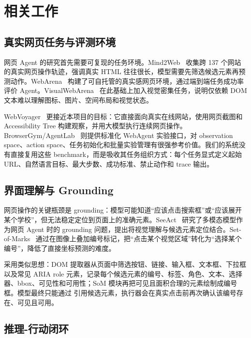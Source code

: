 ﻿%

\section{相关工作}

\subsection{真实网页任务与评测环境}

网页 Agent 的研究首先需要可复现的任务环境。Mind2Web~\cite{mind2web} 收集跨 137 个网站的真实网页操作轨迹，强调真实 HTML 往往很长，模型需要先筛选候选元素再预测动作。WebArena~\cite{webarena} 构建了可自托管的真实感网页环境，通过端到端任务成功率评价 Agent。VisualWebArena~\cite{visualwebarena} 在此基础上加入视觉密集任务，说明仅依赖 DOM 文本难以理解图标、图片、空间布局和视觉状态。

WebVoyager~\cite{webvoyager} 更接近本项目的目标：它直接面向真实在线网站，使用网页截图和 Accessibility Tree 构建观察，并用大模型执行连续网页操作。BrowserGym/AgentLab~\cite{browsergym} 则提供标准化 WebAgent 实验接口，对 observation space、action space、任务初始化和批量实验管理有很强参考价值。我们的系统没有直接复用这些 benchmark，而是吸收其任务组织方式：每个任务显式定义起始 URL、自然语言目标、最大步数、成功标准、禁止动作和 trace 输出。

\subsection{界面理解与 Grounding}

网页操作的关键瓶颈是 grounding：模型可能知道“应该点击搜索框”或“应该展开某个学校”，但无法稳定定位到页面上的准确元素。SeeAct~\cite{seeact} 研究了多模态模型作为网页 Agent 时的 grounding 问题，提出将视觉理解与候选元素定位结合。Set-of-Marks~\cite{som} 通过在图像上叠加编号标记，把“点击某个视觉区域”转化为“选择某个编号”，降低了直接坐标预测的难度。

\projectname{} 采用类似思想：DOM 提取器从页面中筛选按钮、链接、输入框、文本框、下拉框以及常见 ARIA role 元素，记录每个候选元素的编号、标签、角色、文本、选择器、bbox、可见性和可用性；SoM 模块再把可见且面积合理的元素绘制成编号框。模型最终只能通过  引用候选元素，执行器会在真实点击前再次确认该编号存在、可见且可用。

\subsection{推理-行动闭环}

